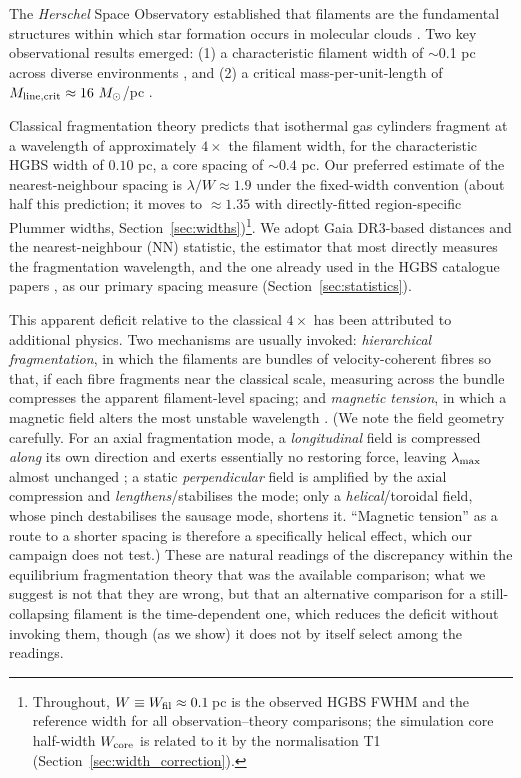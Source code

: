 \documentclass[usenatbib,twoside,twocolumn]{mnras}
\begin{document}
The \textit{Herschel} Space Observatory established that filaments are the fundamental structures within which star formation occurs in molecular clouds \citep{Andre2010}. Two key observational results emerged: (1) a characteristic filament width of $\sim$0.1 pc across diverse environments \citep{Arzoumanian2011}, and (2) a critical mass-per-unit-length of $M_{\rm line,crit} \approx 16~M_\odot$/pc \citep{Ostriker1964}.

Classical fragmentation theory \citep{Inutsuka1992} predicts that isothermal gas cylinders fragment at a wavelength of approximately $4\times$ the filament width, for the characteristic HGBS width of $0.10$ pc, a core spacing of $\sim0.4$ pc. Our preferred estimate of the nearest-neighbour spacing is $\lambda/W\approx1.9$ under the fixed-width convention (about half this prediction; it moves to $\approx1.35$ with directly-fitted region-specific Plummer widths, Section~\ref{sec:widths})\footnote{Throughout, $W\equiv W_{\rm fil}\approx0.1$\,pc is the observed HGBS FWHM and the reference width for all observation--theory comparisons; the simulation core half-width $W_{\rm core}$ is related to it by the normalisation T1 (Section~\ref{sec:width_correction}).}. We adopt Gaia DR3-based distances \citep{Zhang2023} and the nearest-neighbour (NN) statistic, the estimator that most directly measures the fragmentation wavelength, and the one already used in the HGBS catalogue papers \citep{Konyves2015,Konyves2020}, as our primary spacing measure (Section~\ref{sec:statistics}).

This apparent deficit relative to the classical $4\times$ has been attributed to additional physics. Two mechanisms are usually invoked: \emph{hierarchical fragmentation}, in which the filaments are bundles of velocity-coherent fibres \citep{Hacar2013,Hacar2018,Yang2024} so that, if each fibre fragments near the classical scale, measuring across the bundle compresses the apparent filament-level spacing; and \emph{magnetic tension}, in which a magnetic field alters the most unstable wavelength \citep{Nakamura1993}. (We note the field geometry carefully. For an axial fragmentation mode, a \emph{longitudinal} field is compressed \emph{along} its own direction and exerts essentially no restoring force, leaving $\lambda_{\rm max}$ almost unchanged \citep[][consistent with our $\theta=0^\circ$ runs being nearly $\beta$-independent]{Nagasawa1987,Nakamura1993}; a static \emph{perpendicular} field is amplified by the axial compression and \emph{lengthens}/stabilises the mode; only a \emph{helical}/toroidal field, whose pinch destabilises the sausage mode, shortens it. ``Magnetic tension'' as a route to a shorter spacing is therefore a specifically helical effect, which our campaign does not test.) These are natural readings of the discrepancy within the equilibrium fragmentation theory that was the available comparison; what we suggest is not that they are wrong, but that an alternative comparison for a still-collapsing filament is the time-dependent one, which reduces the deficit without invoking them, though (as we show) it does not by itself select among the readings.
\end{document}
